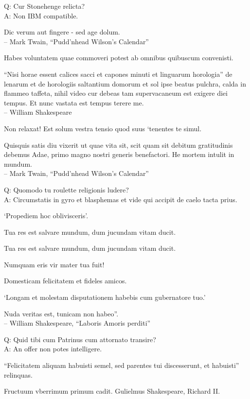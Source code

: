 \documentclass[titlepage,12pt]{memoir}
\begin{document}
Q: Cur Stonehenge relicta?\\
A: Non IBM compatible.

Dic verum aut fingere - sed age dolum.
\\-- Mark Twain, “Pudd’nhead Wilson’s Calendar”

Habes voluntatem quae commoveri potest ab omnibus quibuscum convenisti.

“Nisi horae essent calices sacci et capones minuti et linguarum horologia”
de lenarum et de horologiis saltantium domorum et sol ipse beatus
pulchra, calda in flammeo taffeta, nihil video cur debeas
tam supervacaneum est exigere diei tempus. Et nunc vastata est
tempus terere me.
\\-- William Shakespeare

Non relaxat! Est solum vestra tensio quod suus ‘tenentes te simul.

Quisquis satis diu vixerit ut quae vita sit, scit quam sit debitum
gratitudinis debemus Adae, primo magno nostri generis benefactori. He
mortem intulit in mundum.
\\-- Mark Twain, “Pudd’nhead Wilson’s Calendar”

Q: Quomodo tu roulette religionis ludere?\\
A: Circumstatis in gyro et blasphemas et vide qui accipit
de caelo tacta prius.

‘Propediem hoc oblivisceris’.

Tua res est salvare mundum, dum jucundam vitam ducit.

Tua res est salvare mundum, dum jucundam vitam ducit.

Numquam eris vir mater tua fuit!

 Domesticam felicitatem et fideles amicos.

‘Longam et molestam disputationem habebis cum gubernatore tuo.’

Nuda veritas est, tunicam non habeo”.
\\-- William Shakespeare, “Laboris Amoris perditi”

Q: Quid tibi cum Patrinus cum attornato transire?\\
A: An offer non potes intelligere.

“Felicitatem aliquam habuisti semel, sed parentes tui discesserunt, et habuisti”
relinquas.

Fructuum vberrimum primum cadit.
Gulielmus Shakespeare, Richard II.
\end{document}
